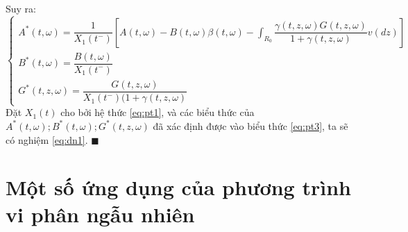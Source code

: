 \documentclass[14pt,a4paper]{article}
\numberwithin{equation}{section}
\begin{document}
Suy ra:
\begin{dmath*}
\begin{cases}
	A^*(t,\omega)=\dfrac{1}{X_1(t^-)} \left[A(t,\omega)-B(t,\omega)\beta(t,\omega)-\int_{R_0} \dfrac{\gamma(t,z,\omega)G(t,z,\omega)}{1+\gamma(t,z,\omega)} v(dz) \right] \\
	B^*(t,\omega)=\dfrac{B(t,\omega)}{X_1(t^-)} \\
	G^*(t,z,\omega)=\dfrac{G(t,z,\omega)}{X_1(t^-)(1+\gamma(t,z,\omega)}
\end{cases}	
\end{dmath*}
Đặt $X_1(t)$ cho bởi hệ thức \eqref{eq:pt1}, và các biểu thức của $A^*(t,\omega);B^*(t,\omega);G^*(t,z,\omega)$ đã xác định được vào biểu thức \eqref{eq:pt3}, ta sẽ có nghiệm \eqref{eq:dn1}. $\blacksquare$\\
\section{Một số ứng dụng của phương trình vi phân ngẫu nhiên}
\end{document}
